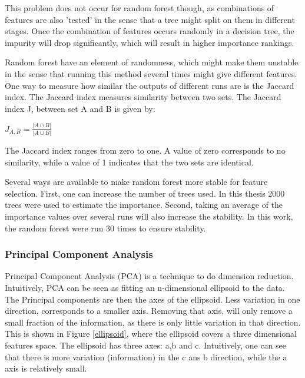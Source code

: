 \npar

This problem does not occur for random forest though, as combinations of features are also 'tested' in the sense that a tree might split on them in different stages. Once the combination of features occurs randomly in a decision tree, the impurity will drop significantly, which will result in higher importance rankings.

\npar

\label{jaccard}
Random forest have an element of randomness, which might make them unstable in the sense that running this method several times might give different features. One way to measure how similar the outputs of different runs are is the Jaccard index. The Jaccard index measures similarity between two sets. The Jaccard index J, between set A and B is given by:
\begin{center}
$J_{A,B} = \frac{|A \cap B|}{|A \cup B|} $
\end{center}
The Jaccard index ranges from zero to one. A value of zero corresponds to no similarity, while a value of 1 indicates that the two sets are identical.

\npar

Several ways are available to make random forest more stable for feature selection. First, one can increase the number of trees used. In this thesis 2000 trees were used to estimate the importance. Second, taking an average of the importance values over several runs will also increase the stability. In this work, the random forest were run 30 times to ensure stability.

\subsubsection{Principal Component Analysis}
\label{pcaExaplained}
Principal Component Analysis (PCA)  is a technique to do dimension reduction. Intuitively, PCA can be seen as fitting an n-dimensional ellipsoid to the data. The Principal components are then the axes of the ellipsoid. Less variation in one direction, corresponds to a smaller axis. Removing that axis, will only remove a small fraction of the information, as there is only little variation in that direction. This is shown in Figure \ref{ellipsoid}, where the ellipsoid covers a three dimensional features space. The ellipsoid has three axes: a,b and c. Intuitively, one can see that there is more variation (information) in the c ans b direction, while the a axis is relatively small.

